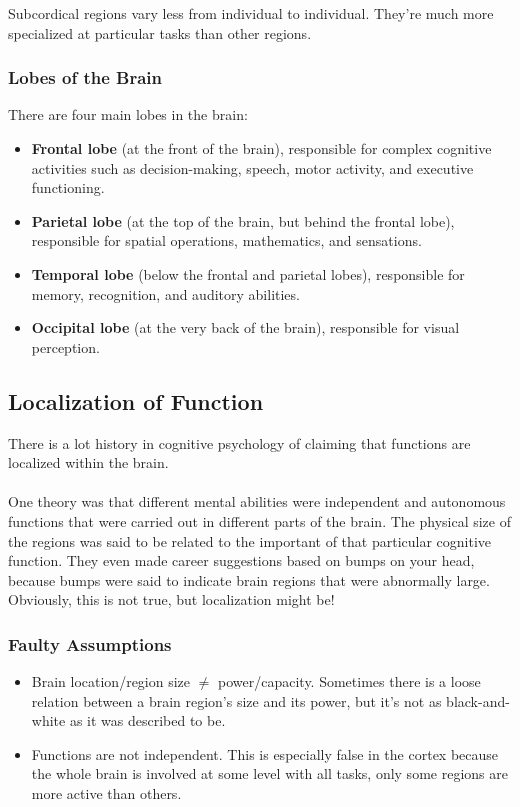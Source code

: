 \documentclass[]{article}
\begin{document}
				Subcordical regions vary less from individual to individual. They're much more specialized at particular tasks than other regions.
			\subsubsection{Lobes of the Brain}
				There are four main lobes in the brain:
				\begin{itemize}
					\item \textbf{Frontal lobe} (at the front of the brain), responsible for complex cognitive activities such as decision-making, speech, motor activity, and executive functioning.
					\item \textbf{Parietal lobe} (at the top of the brain, but behind the frontal lobe), responsible for spatial operations, mathematics, and sensations.
					\item \textbf{Temporal lobe} (below the frontal and parietal lobes), responsible for memory, recognition, and auditory abilities.
					\item \textbf{Occipital lobe} (at the very back of the brain), responsible for visual perception.
				\end{itemize}
		\subsection{Localization of Function}
			There is a lot history in cognitive psychology of claiming that functions are localized within the brain.
			\\ \\
			One theory was that different mental abilities were independent and autonomous functions that were carried out in different parts of the brain. The physical size of the regions was said to be related to the important of that particular cognitive function. They even made career suggestions based on bumps on your head, because bumps were said to indicate brain regions that were abnormally large. Obviously, this is not true, but localization might be! 
			\subsubsection{Faulty Assumptions}
				\begin{itemize}
					\item Brain location/region size $\ne$ power/capacity. Sometimes there is a loose relation between a brain region's size and its power, but it's not as black-and-white as it was described to be.
					\item Functions are not independent. This is especially false in the cortex because the whole brain is involved at some level with all tasks, only some regions are more active than others.
				\end{itemize}
\end{document}
